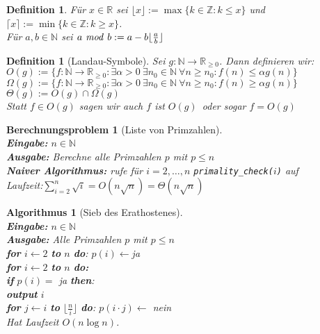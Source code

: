 \documentclass[12pt,a4paper]{article}
\theoremstyle{plain}
\newtheorem{Definition}[Theorem]{Definition}
\newtheorem{Algorithmus}[Theorem]{Algorithmus}
\newtheorem{Berechnungsproblem}[Theorem]{Berechnungsproblem}
\newcommand{\N}{\mathbb{N}}
\numberwithin{equation}{section}
\begin{document}
\begin{Definition}
Für $x\in \mathbb{R}$ sei $\lfloor x \rfloor := \max\{k\in \mathbb{Z}: k\leq x\}$ und $\lceil x\rceil := \min\{k\in \mathbb{Z}: k\geq x\}$.\\
Für $a,b\in \mathbb{N}$ sei $a\text{\emph{ mod }}b := a-b\lfloor\frac{a}{b}\rfloor$
\end{Definition}
\begin{Definition}[Landau-Symbole]
Sei $g: \mathbb{N} \rightarrow \mathbb{R}_{\geq 0}$. Dann definieren wir: \\
$O(g):=\{f:\mathbb{N}\rightarrow\mathbb{R}_{\geq 0}: \exists \alpha >0\ \exists n_0 \in \mathbb{N}\ \forall n\geq n_0: f(n)\leq \alpha g(n)\}$ \\
$\Omega(g):=\{f:\mathbb{N}\rightarrow\mathbb{R}_{\geq 0}: \exists \alpha >0\ \exists n_0 \in \mathbb{N}\ \forall n\geq n_0: f(n)\geq \alpha g(n)\}$\\
$\Theta(g):=O(g)\cap\Omega(g)$ \\
Statt $f\in O(g)$ sagen wir auch \glqq $f$ ist $O(g)$\grqq\ oder sogar \glqq$f=O(g)$\grqq
\end{Definition}
\begin{Berechnungsproblem}[Liste von Primzahlen]\\
\textbf{Eingabe:} $n \in \N$ \\
\textbf{Ausgabe:} Berechne alle Primzahlen $p$ mit $p\leq n$\\
\textbf{Naiver Algorithmus:} rufe für $i=2,\ldots,n$ \texttt{primality\_check($i$)} auf\\
Laufzeit:$\sum_{i=2}^n \sqrt{i}=O(n\sqrt{n})=\Theta(n\sqrt{n})$
\end{Berechnungsproblem}
\begin{Algorithmus}[Sieb des Erathostenes]\\
\textbf{Eingabe:} $n \in \N$\\
\textbf{Ausgabe:} Alle Primzahlen $p$ mit $p\leq n$\\
\textbf{for} $i \leftarrow 2$ \textbf{to} $n$ \textbf{do}: $p(i) \leftarrow$ja\\
\textbf{for} $i\leftarrow 2$ \textbf{to} $n$ \textbf{do:}\\
\text{\qquad}\textbf{if} $p(i)=$ ja \textbf{then}:\\
\text{\qquad \qquad}\textbf{output} $i$\\
\text{\qquad \qquad}\textbf{for} $j\leftarrow i$ \textbf{to} $\lfloor\frac{n}{i}\rfloor$ \textbf{do}: $p(i\cdot j) \leftarrow$ nein \\
Hat Laufzeit $O(n\log n)$.
\end{Algorithmus}
\end{document}
